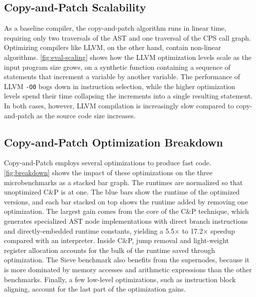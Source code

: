 \documentclass[acmsmall,nonacm,screen]{acmart}\settopmatter{printfolios=true,printccs=true,printacmref=false}
\newcommand{\figref}[1]{\autoref{#1}}
\newcommand{\llvm}{LLVM}
\newcommand{\ozero}{\texttt{-O0}}
\newcommand{\cp}{copy-and-patch}
\newcommand{\cpcap}{Copy-and-Patch}
\newcommand{\cpshort}{C\&P}
\newcommand{\X}{$\times$}
\begin{document}
\subsection{Copy-and-Patch Scalability}

As a baseline compiler, the \cp{} algorithm runs in linear time, requiring only two traversals of the AST and one traversal of the CPS call graph. Optimizing compilers like \llvm{}, on the other hand, contain non-linear algorithms. \figref{fig:eval-scaling} shows how the \llvm{} optimization levels scale as the input program size grows, on a synthetic function containing a sequence of statements that increment a variable by another variable. The performance of \llvm{} \ozero{} bogs down in instruction selection, while the higher optimization levels spend their time collapsing the increments into a single resulting statement. In both cases, however, \llvm{} compilation is increasingly slow compared to \cp{} as the source code size increases.

\subsection{Copy-and-Patch Optimization Breakdown}

\cpcap{} employs several optimizations to produce fast code. \figref{fig:breakdown} shows the impact of these optimizations on the three microbenchmarks as a stacked bar graph. The runtimes are normalized so that unoptimized \cpshort{} is at one. The blue bars show the runtime of the optimized versions, and each bar stacked on top shows the runtime added by removing one optimization. The largest gain comes from the core of the \cpshort{} technique, which generates specialized AST node implementations with direct branch instructions and directly-embedded runtime constants, yielding a \num{5.5}\X{} to \num{17.2}\X{} speedup compared with an interpreter. Inside \cpshort{}, jump removal and light-weight register allocation accounts for the bulk of the runtime saved through optimization. The Sieve benchmark also benefits from the supernodes, because it is more dominated by memory accesses and arithmetic expressions than the other benchmarks. Finally, a few low-level optimizations, such as instruction block aligning, account for the last part of the optimization gains.  
\end{document}
